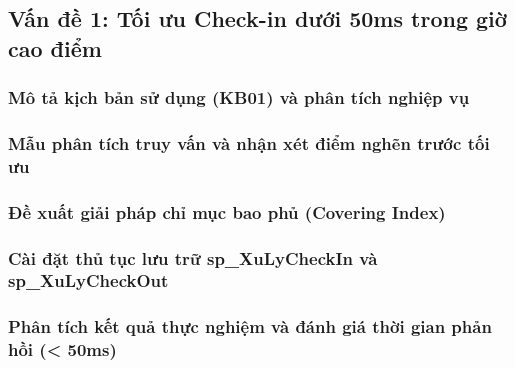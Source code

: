 \subsection{Vấn đề 1: Tối ưu Check-in dưới 50ms trong giờ cao điểm}

\subsubsection{Mô tả kịch bản sử dụng (KB01) và phân tích nghiệp vụ}

\subsubsection{Mẫu phân tích truy vấn và nhận xét điểm nghẽn trước tối ưu}

\subsubsection{Đề xuất giải pháp chỉ mục bao phủ (Covering Index)}

\subsubsection{Cài đặt thủ tục lưu trữ sp\_XuLyCheckIn và sp\_XuLyCheckOut}

\subsubsection{Phân tích kết quả thực nghiệm và đánh giá thời gian phản hồi (< 50ms)}
